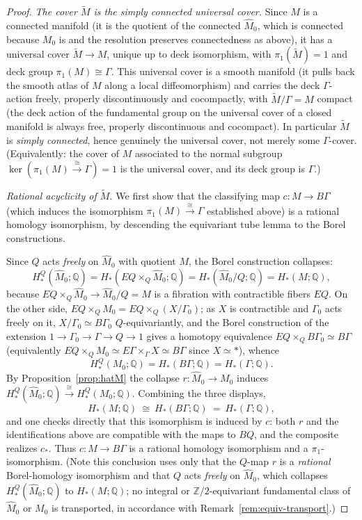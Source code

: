 \documentclass[12pt]{article}
\theoremstyle{definition}
\begin{document}
\begin{proof}
\emph{The cover $\widetilde M$ is the simply connected universal cover.} Since
$M$ is a connected manifold (it is the quotient of the connected $\widehat M_0$,
which is connected because $M_0$ is and the resolution preserves connectedness as
above), it has a universal cover $\widetilde M\to M$, unique up to deck
isomorphism, with $\pi_1(\widetilde M)=1$ and deck group $\pi_1(M)\cong\Gamma$.
This universal cover is a smooth manifold (it pulls back the smooth atlas of $M$
along a local diffeomorphism) and carries the deck $\Gamma$-action freely,
properly discontinuously and cocompactly, with $\widetilde M/\Gamma=M$ compact
(the deck action of the fundamental group on the universal cover of a closed
manifold is always free, properly discontinuous and cocompact). In particular
$\widetilde M$ is \emph{simply connected}, hence genuinely the universal cover,
not merely some $\Gamma$-cover. (Equivalently: the cover of $M$ associated to the
normal subgroup $\ker(\pi_1(M)\xrightarrow{\cong}\Gamma)=1$ is the universal
cover, and its deck group is $\Gamma$.)

\emph{Rational acyclicity of $\widetilde M$.} We first show that the
classifying map $c\colon M\to B\Gamma$ (which induces the isomorphism
$\pi_1(M)\xrightarrow{\cong}\Gamma$ established above) is a rational homology
isomorphism, by descending the equivariant tube lemma to the Borel
constructions.

Since $Q$ acts \emph{freely} on $\widehat M_0$ with quotient $M$, the Borel
construction collapses:
\[
   H^Q_*(\widehat M_0;\mathbb{Q})
   = H_*(EQ\times_Q\widehat M_0;\mathbb{Q})
   = H_*(\widehat M_0/Q;\mathbb{Q}) = H_*(M;\mathbb{Q}),
\]
because $EQ\times_Q\widehat M_0\to\widehat M_0/Q=M$ is a fibration with
contractible fibers $EQ$. On the other side, $EQ\times_Q M_0=EQ\times_Q(X/\Gamma_0)$;
as $X$ is contractible and $\Gamma_0$ acts freely on it, $X/\Gamma_0\simeq B\Gamma_0$
$Q$-equivariantly, and the Borel construction of the extension
$1\to\Gamma_0\to\Gamma\to Q\to1$ gives a homotopy equivalence
$EQ\times_Q B\Gamma_0\simeq B\Gamma$ (equivalently
$EQ\times_Q M_0\simeq E\Gamma\times_\Gamma X\simeq B\Gamma$ since $X\simeq\ast$),
whence
\[
   H^Q_*(M_0;\mathbb{Q})=H_*(B\Gamma;\mathbb{Q})=H_*(\Gamma;\mathbb{Q}).
\]
By Proposition~\ref{prop:hatM} the collapse $r\colon\widehat M_0\to M_0$ induces
$H^Q_*(\widehat M_0;\mathbb{Q})\xrightarrow{\cong}H^Q_*(M_0;\mathbb{Q})$.
Combining the three displays,
\begin{equation}\label{eq:Mhomology}
   H_*(M;\mathbb{Q})\ \cong\ H_*(B\Gamma;\mathbb{Q})\ =\ H_*(\Gamma;\mathbb{Q}),
\end{equation}
and one checks directly that this isomorphism is induced by $c$: both $r$ and the
identifications above are compatible with the maps to $BQ$, and the composite
realizes $c_*$. Thus $c\colon M\to B\Gamma$ is a rational homology isomorphism
and a $\pi_1$-isomorphism. (Note this conclusion uses only that the $Q$-map $r$
is a \emph{rational} Borel-homology isomorphism and that $Q$ acts \emph{freely}
on $\widehat M_0$, which collapses $H^Q_*(\widehat M_0;\mathbb{Q})$ to
$H_*(M;\mathbb{Q})$; no integral or $\mathbb{Z}/2$-equivariant fundamental class
of $\widehat M_0$ or $M_0$ is transported, in accordance with
Remark~\ref{rem:equiv-transport}.)


\end{proof}
\end{document}

